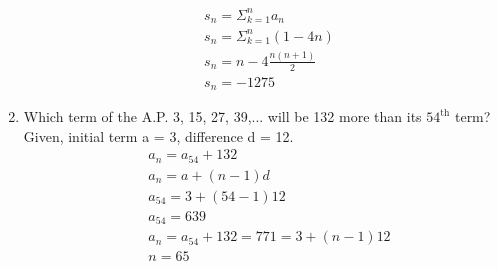 \documentclass[journal,12pt,twocolumn]{IEEEtran}
\renewcommand\thesection{\arabic{section}}
\begin{document}
\begin{enumerate}[label=\thesection.\arabic*.,ref=\thesection.\theenumi]
\begin{align}
&s_n = \Sigma_{k=1}^{n}a_n \\
&s_n = \Sigma_{k=1}^{n}(1-4n) \\
&s_n = n - 4\displaystyle\frac{n(n+1)}{2}\\
& s_n = -1275
\end{align}
\item Which term of the A.P. 3, 15, 27, 39,... will be 132 more than its $54^{\text{th}}$ term?\\
\solution 
Given, initial term a = 3, difference d = 12.
\begin{align}
&a_n = a_{54} + 132\\
&a_n = a + (n-1)d\\ 
&a_{54} = 3 + (54 - 1)12\\
&a_{54} = 639\\
&a_n = a_{54} + 132 = 771 = 3 + (n - 1)12\\
&n= 65
\end{align}
\end{enumerate}
\end{document}
